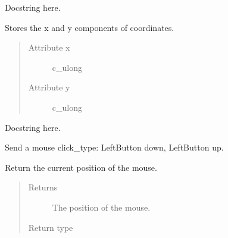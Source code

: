 \documentclass[letterpaper,10pt,english]{sphinxmanual}
\begin{document}

\begin{fulllineitems}
\label{macro:macro.KeyBdInput}
Docstring here.

\end{fulllineitems}


\begin{fulllineitems}
\label{macro:macro.MacroPoint}
Stores the x and y components of coordinates.
\begin{quote}\begin{description}
\item[{Attribute x}] \leavevmode
c\_ulong

\item[{Attribute y}] \leavevmode
c\_ulong

\end{description}\end{quote}

\end{fulllineitems}


\begin{fulllineitems}
\label{macro:macro.MouseInput}
Docstring here.

\end{fulllineitems}


\begin{fulllineitems}
\label{macro:macro.click}
Send a mouse click\_type: LeftButton down, LeftButton up.

\end{fulllineitems}


\begin{fulllineitems}
\label{macro:macro.get_mouse_position}
Return the current position of the mouse.
\begin{quote}\begin{description}
\item[{Returns}] \leavevmode
The position of the mouse.

\item[{Return type}] \leavevmode
{\hyperref[macro:macro.MacroPoint]{}}

\end{description}\end{quote}

\end{fulllineitems}
\end{document}
